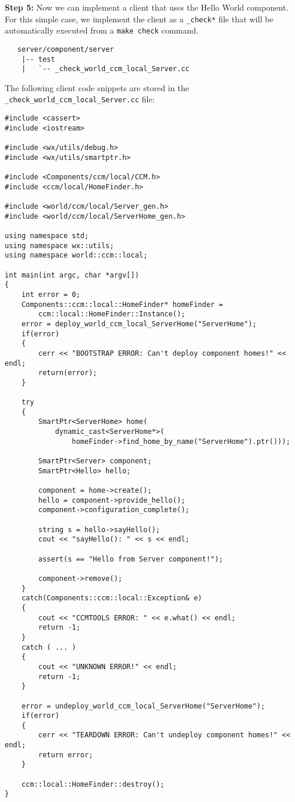 \noindent
{\bf Step 5:} Now we can implement a client that uses the Hello World
component. For this simple case, we implement the client as a {\tt \_check*}
file that will be automatically executed from a {\tt make check} command.

\begin{small}
\begin{verbatim}
   server/component/server
    |-- test
    |   `-- _check_world_ccm_local_Server.cc
\end{verbatim}
\end{small}

\noindent
The following client code snippets are stored in the 
{\tt \_check\_world\_ccm\_local\_Server.cc} file:
\begin{small}
\begin{verbatim}
#include <cassert>
#include <iostream>

#include <wx/utils/debug.h>
#include <wx/utils/smartptr.h>

#include <Components/ccm/local/CCM.h>
#include <ccm/local/HomeFinder.h>

#include <world/ccm/local/Server_gen.h>
#include <world/ccm/local/ServerHome_gen.h>

using namespace std;
using namespace wx::utils;
using namespace world::ccm::local;

int main(int argc, char *argv[])
{
    int error = 0;
    Components::ccm::local::HomeFinder* homeFinder = 
        ccm::local::HomeFinder::Instance();
    error = deploy_world_ccm_local_ServerHome("ServerHome");
    if(error)
    {
        cerr << "BOOTSTRAP ERROR: Can't deploy component homes!" << endl;
        return(error);
    }

    try
    {
        SmartPtr<ServerHome> home(
            dynamic_cast<ServerHome*>(
                homeFinder->find_home_by_name("ServerHome").ptr()));

        SmartPtr<Server> component;
        SmartPtr<Hello> hello;

        component = home->create();
        hello = component->provide_hello();
        component->configuration_complete();

        string s = hello->sayHello();
        cout << "sayHello(): " << s << endl;

        assert(s == "Hello from Server component!");

        component->remove();
    }
    catch(Components::ccm::local::Exception& e)
    {
        cout << "CCMTOOLS ERROR: " << e.what() << endl;
        return -1;
    }
    catch ( ... )
    {
        cout << "UNKNOWN ERROR!" << endl;
        return -1;
    }

    error = undeploy_world_ccm_local_ServerHome("ServerHome");
    if(error)
    {
        cerr << "TEARDOWN ERROR: Can't undeploy component homes!" << endl;
        return error;
    }

    ccm::local::HomeFinder::destroy();
}
\end{verbatim}
\end{small}

